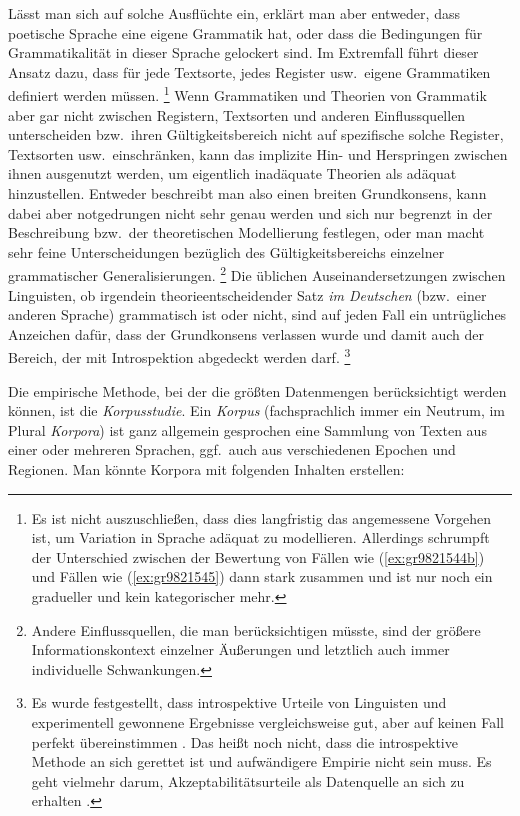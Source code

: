Lässt man sich auf solche Ausflüchte ein, erklärt man aber entweder, dass poetische Sprache eine eigene Grammatik hat, oder dass die Bedingungen für Grammatikalität in dieser Sprache gelockert sind.
Im Extremfall führt dieser Ansatz dazu, dass für jede Textsorte, jedes Register usw.\ eigene Grammatiken definiert werden müssen.%
\footnote{Es ist nicht auszuschließen, dass dies langfristig das angemessene Vorgehen ist, um Variation in Sprache adäquat zu modellieren.
Allerdings schrumpft der Unterschied zwischen der Bewertung von Fällen wie (\ref{ex:gr9821544b}) und Fällen wie (\ref{ex:gr9821545}) dann stark zusammen und ist nur noch ein gradueller und kein kategorischer mehr.}
Wenn Grammatiken und Theorien von Grammatik aber gar nicht zwischen Registern, Textsorten und anderen Einflussquellen unterscheiden bzw.\ ihren Gültigkeitsbereich nicht auf spezifische solche Register, Textsorten usw.\ einschränken, kann das implizite Hin- und Herspringen zwischen ihnen ausgenutzt werden, um eigentlich inadäquate Theorien als adäquat hinzustellen.
Entweder beschreibt man also einen breiten Grundkonsens, kann dabei aber notgedrungen nicht sehr genau werden und sich nur begrenzt in der Beschreibung bzw.\ der theoretischen Modellierung festlegen, oder man macht sehr feine Unterscheidungen bezüglich des Gültigkeitsbereichs einzelner grammatischer Generalisierungen.%
\footnote{Andere Einflussquellen, die man berücksichtigen müsste, sind der größere Informationskontext einzelner Äußerungen und letztlich auch immer individuelle Schwankungen.}
Die üblichen Auseinandersetzungen zwischen Linguisten, ob irgendein theorieentscheidender Satz \textit{im Deutschen} (bzw.\ einer anderen Sprache) grammatisch ist oder nicht, sind auf jeden Fall ein untrügliches Anzeichen dafür, dass der Grundkonsens verlassen wurde und damit auch der Bereich, der mit Introspektion abgedeckt werden darf.%
\footnote{Es wurde festgestellt, dass introspektive Urteile von Linguisten und experimentell gewonnene Ergebnisse vergleichsweise gut, aber auf keinen Fall perfekt übereinstimmen \citep{SprouseEa2013}.
	Das heißt noch nicht, dass die introspektive Methode an sich gerettet ist und aufwändigere Empirie nicht sein muss.
	Es geht vielmehr darum, Akzeptabilitätsurteile als Datenquelle an sich zu erhalten \citep{SchuetzeSprouse2014}.}

Die empirische Methode, bei der die größten Datenmengen berücksichtigt werden können, ist die \textit{Korpusstudie}.
Ein \textit{Korpus} (fachsprachlich immer ein Neutrum, im Plural \textit{Korpora}) ist ganz allgemein gesprochen eine Sammlung von Texten aus einer oder mehreren Sprachen, ggf.\ auch aus verschiedenen Epochen und Regionen.
Man könnte \zB Korpora mit folgenden Inhalten erstellen:

